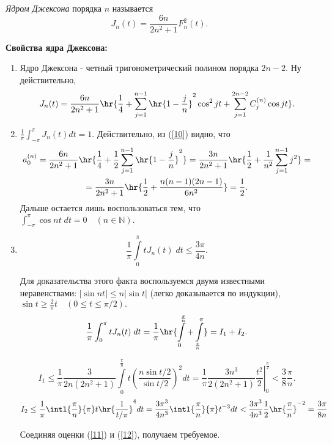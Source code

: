 \documentclass{article}
\begin{document}
\begin{df}
  \emph{Ядром Джексона} порядка $n$
  называется
  $$J_n(t)=\frac{6n}{2n^2+1}F_n^2(t).$$
\end{df}

\noindent\textbf{Свойства ядра Джексона:}
\begin{enumerate}
\item
Ядро Джексона - четный тригонометрический полином порядка $2n-2.$ Ну
действительно,
\begin{equation}\label{10}
J_n(t)=\frac{6n}{2n^2+1}\hr{\frac14+\sum_{j=1}^{n-1}
\hr{1-\frac jn}^2\cos^2 jt+\sum_{j=1}^{2n-2}C_j^{(n)}\cos
jt}.
\end{equation}
\item
$\frac1{\pi}\int_{-\pi}^{\pi}J_n(t)dt=1.$ Действительно, из
(\ref{10}) видно, что
\begin{multline*}
a_0^{(n)}=\frac{6n}{2n^2+1}\hr{\frac14+\frac12\sum_{j=1}^{n-1}
\hr{1-\frac jn}^2}=\frac{3n}{2n^2+1}\hr{\frac12+\frac1{n^2}\sum_{j=1}^{n-1}j^2}=\\
=\frac{3n}{2n^2+1}\hr{\frac12+\frac{n(n-1)(2n-1)}{6n^2}}=\frac12.
\end{multline*}
Дальше остается лишь воспользоваться тем, что
$\int_{-\pi}^{\pi}\cos nt \;dt=0\quad(n\in\mathbb{N}).$
\item
$$\frac1{\pi}\int\limits_0^{\pi} tJ_n(t)\;dt\le\frac{3\pi}{4n}.$$

Для доказательства этого факта воспользуемся двумя известными
неравенствами: $|\sin nt|\le n|\sin t|$ (легко доказывается по
индукции), $\sin t\ge \frac2{\pi}t\quad (0\le t\le\pi/2).$
$$\frac1{\pi}\int_0^{\pi}
tJ_n(t)\;dt=\frac1{\pi}\hr{\int\limits_0^{\frac{\pi}{n}}+\int\limits_{\frac{\pi}{n}}^{\pi}}=I_1+I_2.$$

\begin{equation}\label{11}
I_1\le\frac1{\pi}\frac{3}{2n(2n^2+1)}\int\limits_0^{\frac{\pi}{n}}
t\left(\frac{n\sin t/2}{\sin t/2}\right)^2dt=
\left.\frac1{\pi}\frac{3n^3}{2(2n^2+1)}\frac{t^2}2\right|_0^{\frac{\pi}2}<\frac38\frac{\pi}n.
\end{equation}
\begin{equation}\label{12}
I_2\le\frac1{\pi}\intl{\frac{\pi}{n}}{\pi}
t\hr{\frac1{t/\pi}}^4dt=\frac{3\pi^3}{4n^3}\intl{\frac{\pi}{n}}{\pi}t^{-3}dt<\frac{3\pi^3}{4n^3}\frac12\hr{\frac{\pi}n}^{-2}=\frac{3\pi}{8n}
\end{equation}

Соединяя оценки (\ref{11}) и (\ref{12}), получаем требуемое.
\end{enumerate}
\end{document}

